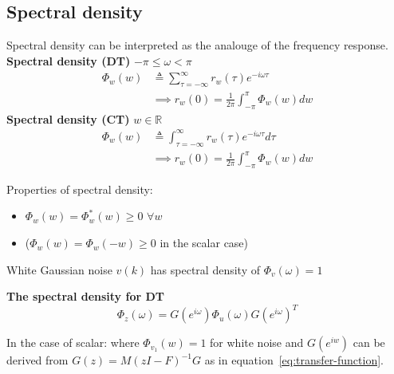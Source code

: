 \begin{multicols}{2}
\subsection{Spectral density}
Spectral density can be interpreted as the analouge of the frequency response. \newline
\textbf{Spectral density (DT)} $-\pi\leq\omega<\pi$ %
\begin{align*}
    \Phi_w(w) &\triangleq \sum_{\tau=-\infty}^{\infty} r_{w}(\tau)e^{-i\omega\tau} \\
    &\implies  r_w(0) = \frac{1}{2\pi}\int_{-\pi}^{\pi} \Phi_w(w)dw
\end{align*}
\textbf{Spectral density (CT)} $w\in\mathbb{R}$
\begin{align*}
    \Phi_w(w) &\triangleq \int_{\tau=-\infty}^{\infty} r_{w}(\tau)e^{-i\omega\tau}d\tau \\
    &\implies r_w(0) = \frac{1}{2\pi}\int_{-\pi}^{\pi} \Phi_w(w)dw
\end{align*}

Properties of spectral density:
\begin{itemize}
    \item $\Phi_w(w) = \Phi^*_w(w) \geq 0$ $\forall w$
    \item ($\Phi_w(w) = \Phi_w(-w) \geq 0$ in the scalar case)
\end{itemize}
White Gaussian noise $v(k)$ has spectral density of $\Phi_v(\omega)=1$

\textbf{The spectral density for DT}
\begin{equation*}
    \Phi_z(\omega) = G(e^{i\omega})\Phi_u(\omega)G(e^{i\omega})^T
\end{equation*}

In the case of scalar:
where $\Phi_{v_1}(w)=1$ for white noise and $G(e^{iw})$ can be derived from $G(z) = M(zI-F)^{-1}G$ as in equation~\ref{eq:transfer-function}.


\end{multicols}
